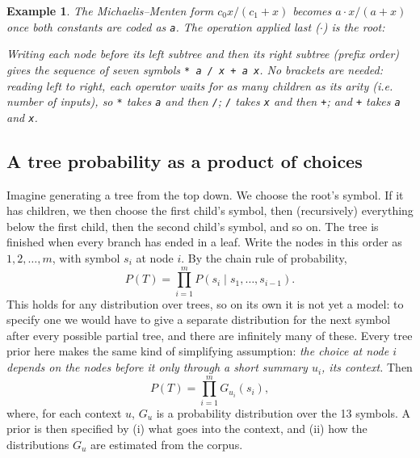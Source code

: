 \documentclass[11pt]{article}
\newtheorem{example}{Example}
\begin{document}
\begin{example}\label{ex:mm}
The Michaelis--Menten form $c_0 x/(c_1+x)$ becomes $a \cdot x/(a+x)$ once both constants are
coded as \texttt{a}. The operation applied last ($\cdot$) is the root:
\begin{center}
\end{center}
Writing each node before its left subtree and then its right subtree (\emph{prefix order}) gives the
sequence of seven symbols \texttt{* a / x + a x}. No brackets are needed: reading left to right, each
operator waits for as many children as its arity (i.e. number of inputs), so \texttt{*} takes \texttt{a} and then \texttt{/};
\texttt{/} takes \texttt{x} and then \texttt{+}; and \texttt{+} takes \texttt{a} and \texttt{x}.
\end{example}

\subsection{A tree probability as a product of choices}

Imagine generating a tree from the top down. We choose the root's symbol. If it has children, we then
choose the first child's symbol, then (recursively) everything below the first child, then the second
child's symbol, and so on. The tree is finished when every branch has ended in a leaf. Write the nodes
in this order as $1, 2, \dots, m$, with symbol $s_i$ at node $i$. By the chain rule of probability,
\begin{equation}\label{eq:chain}
  P(T) = \prod_{i=1}^{m} P(s_i \mid s_1, \dots, s_{i-1}).
\end{equation}
This holds for any distribution over trees, so on its own it is not yet a model: to specify one we
would have to give a separate distribution for the next symbol after every possible partial tree, and
there are infinitely many of these. Every tree prior here makes the same kind of simplifying
assumption: \emph{the choice at node $i$ depends on the nodes before it only through a short summary
$u_i$, its context.} Then
\begin{equation}\label{eq:product}
  P(T) = \prod_{i=1}^{m} G_{u_i}(s_i),
\end{equation}
where, for each context $u$, $G_u$ is a probability distribution over the 13 symbols. A prior is then
specified by (i) what goes into the context, and (ii) how the distributions $G_u$ are estimated from the
corpus.
\end{document}
